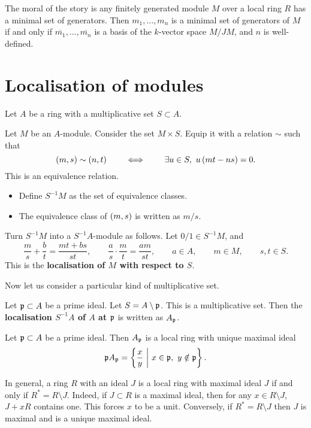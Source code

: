The moral of the story is any finitely generated module $ M $ over a local ring $ R $ has a minimal set of generators. Then $ m_1, \dots, m_n $ is a minimal set of generators of $ M $ if and only if $ \overline{m_1}, \dots, \overline{m_n} $ is a basis of the $ k $-vector space $ M / JM $, and $ n $ is well-defined.

\section{Localisation of modules}

Let $ A $ be a ring with a multiplicative set $ S \subset A $.

\begin{definition}
Let $ M $ be an $ A $-module. Consider the set $ M \times S $. Equip it with a relation $ \sim $ such that
$$ \br{m, s} \sim \br{n, t} \qquad \iff \qquad \exists u \in S, \ u\br{mt - ns} = 0. $$
This is an equivalence relation.
\begin{itemize}
\item Define $ S^{-1}M $ as the set of equivalence classes.
\item The equivalence class of $ \br{m, s} $ is written as $ m / s $.
\end{itemize}
Turn $ S^{-1}M $ into a $ S^{-1}A $-module as follows. Let $ 0 / 1 \in S^{-1}M $, and
$$ \dfrac{m}{s} + \dfrac{b}{t} = \dfrac{mt + bs}{st}, \qquad \dfrac{a}{s} \cdot \dfrac{m}{t} = \dfrac{am}{st}, \qquad a \in A, \qquad m \in M, \qquad s, t \in S. $$
This is the \textbf{localisation of $ M $ with respect to $ S $}.
\end{definition}

\pagebreak

Now let us consider a particular kind of multiplicative set.

\begin{definition}
Let $ \mathfrak{p} \subset A $ be a prime ideal. Let $ S = A \setminus \mathfrak{p} $. This is a multiplicative set. Then the \textbf{localisation $ S^{-1}A $ of $ A $ at $ \mathfrak{p} $} is written as $ A_{\mathfrak{p}} $.
\end{definition}

\begin{theorem}
Let $ \mathfrak{p} \subset A $ be a prime ideal. Then $ A_{\mathfrak{p}} $ is a local ring with unique maximal ideal
$$ \ppp A_\ppp = \cbr{\dfrac{x}{y} \st x \in \ppp, \ y \notin \ppp}. $$
\end{theorem}

\begin{remark*}
In general, a ring $ R $ with an ideal $ J $ is a local ring with maximal ideal $ J $ if and only if $ R^* = R \setminus J $. Indeed, if $ J \subset R $ is a maximal ideal, then for any $ x \in R \setminus J $, $ J + xR $ contains one. This forces $ x $ to be a unit. Conversely, if $ R^* = R \setminus J $ then $ J $ is maximal and is a unique maximal ideal.
\end{remark*}

